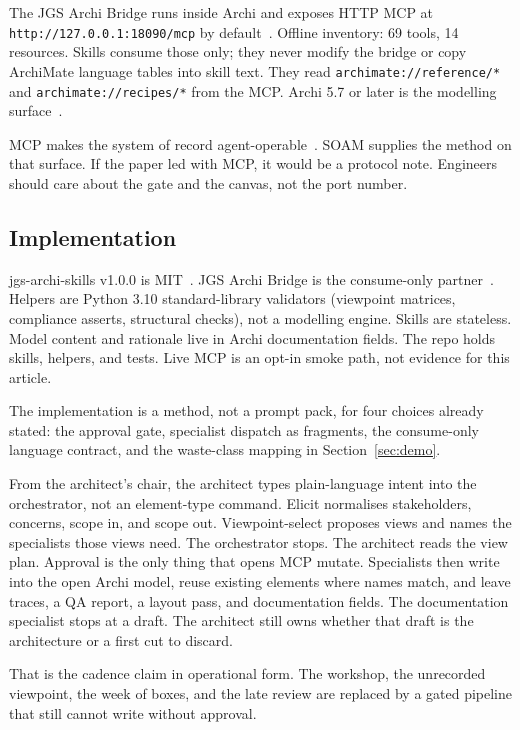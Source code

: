 \documentclass[10pt,journal,compsoc]{IEEEtran}
\begin{document}
The JGS Archi Bridge runs inside Archi and exposes HTTP MCP at \texttt{http://127.0.0.1:18090/mcp} by default~\cite{mcp2025,hou2025,jgsarchibridge}. Offline inventory: 69 tools, 14 resources. Skills consume those only; they never modify the bridge or copy ArchiMate language tables into skill text. They read \texttt{archimate://reference/*} and \texttt{archimate://recipes/*} from the MCP. Archi 5.7 or later is the modelling surface~\cite{archi,jgsarchiskills}.

MCP makes the system of record agent-operable~\cite{mcp2025}. SOAM supplies the method on that surface. If the paper led with MCP, it would be a protocol note. Engineers should care about the gate and the canvas, not the port number.

\subsection{Implementation}

jgs-archi-skills v1.0.0 is MIT~\cite{jgsarchiskills}. JGS Archi Bridge is the consume-only partner~\cite{jgsarchibridge}. Helpers are Python 3.10 standard-library validators (viewpoint matrices, compliance asserts, structural checks), not a modelling engine. Skills are stateless. Model content and rationale live in Archi documentation fields. The repo holds skills, helpers, and tests. Live MCP is an opt-in smoke path, not evidence for this article.

The implementation is a method, not a prompt pack, for four choices already stated: the approval gate, specialist dispatch as fragments, the consume-only language contract, and the waste-class mapping in Section~\ref{sec:demo}.

From the architect's chair, the architect types plain-language intent into the orchestrator, not an element-type command. Elicit normalises stakeholders, concerns, scope in, and scope out. Viewpoint-select proposes views and names the specialists those views need. The orchestrator stops. The architect reads the view plan. Approval is the only thing that opens MCP mutate. Specialists then write into the open Archi model, reuse existing elements where names match, and leave traces, a QA report, a layout pass, and documentation fields. The documentation specialist stops at a draft. The architect still owns whether that draft is the architecture or a first cut to discard.

That is the cadence claim in operational form. The workshop, the unrecorded viewpoint, the week of boxes, and the late review are replaced by a gated pipeline that still cannot write without approval.
\end{document}
